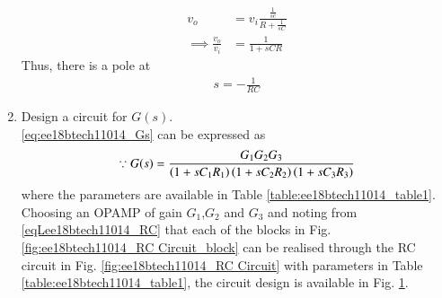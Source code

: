 \begin{enumerate}[label=\thesection.\arabic*.,ref=\thesection.\theenumi]
\solution
\begin{align}
v_o &= v_i \frac{\frac{1}{sc}}{R + \frac{1}{sC}}
\\
\implies \frac{v_o}{v_i}&= \frac{1}{1+sCR}
\label{eqLee18btech11014_RC}
\end{align}
%
Thus, there is a pole at
%
\begin{align}
s = -\frac{1}{RC}
\end{align}
%
%
\item Design a circuit for $G(s)$.
\\
\solution \eqref{eq:ee18btech11014_Gs} can be expressed as
%
\begin{align}
\because G(s) = \frac{G_1 G_2 G_3}{\left(1+sC_1R_1\right)\left(1+sC_2R_2\right)\left(1+sC_3R_3\right)}
\end{align}
%
where the parameters are available in Table \ref{table:ee18btech11014_table1}.  Choosing an OPAMP of gain %
$G_1$,$G_2$ and $G_3$ and noting from \eqref{eqLee18btech11014_RC} that each of the blocks in Fig. 	\ref{fig:ee18btech11014_RC Circuit_block} can be realised through the RC circuit in Fig. 	\ref{fig:ee18btech11014_RC Circuit} with parameters in Table \ref{table:ee18btech11014_table1}, the circuit design is available in 
Fig. 	\ref{fig:ee18btech11014_Open-Loop Circuit}. 
%
\begin{table}[!ht]
\centering

\caption{}
\label{table:ee18btech11014_table1}
\end{table}
%
\begin{figure}[ht!]
	\begin{center}
		\resizebox{\columnwidth/1}{!}{}
	\end{center}
	\caption{}
	\label{fig:ee18btech11014_Open-Loop Circuit}
\end{figure}
 

\end{enumerate}
